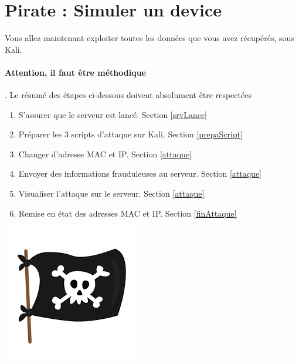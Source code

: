 \documentclass[french, 12pt]{article}%
\begin{document}
\newpage
\section{Pirate : Simuler un device}

Vous allez maintenant exploiter toutes les données que vous avez récupérés, sous Kali. 


\paragraph{Attention, il faut être méthodique}. Le résumé des étapes ci-dessous doivent absolument être respectées 

\begin{minipage}{0.65\linewidth}

\begin{enumerate}[label=\alph*.]
\item S'assurer que le serveur est lancé. Section \ref{srvLance}
\item Préparer les 3 scripts d'attaque sur Kali. Section \ref{prepaScript}
\item Changer d'adresse MAC et IP. Section \ref{attaque}
\item Envoyer des informations frauduleuses au serveur.  Section \ref{attaque}
\item Visualiser l'attaque sur le serveur. Section \ref{attaque}
\item Remise en état des adresses MAC et IP. Section \ref{finAttaque}
\end{enumerate}


\end{minipage}
\begin{minipage}{0.34\linewidth}
\begin{center}
\includegraphics[scale=0.5]{./ressource/logoHacker.png}
\end{center}
\end{minipage}
\end{document}

